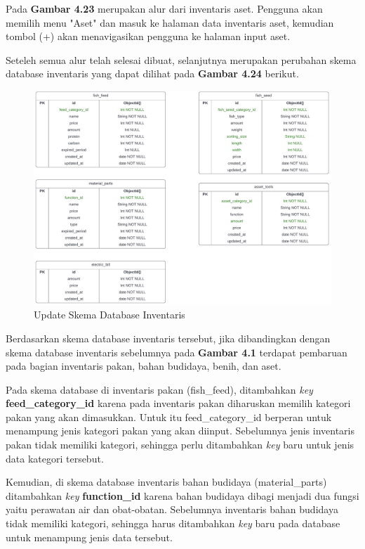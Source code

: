 \begin{spacing}{1.5}
	Pada \textbf{Gambar 4.23} merupakan alur dari inventaris aset. Pengguna akan memilih menu "Aset" dan masuk ke halaman data inventaris aset, kemudian tombol (+) akan menavigasikan pengguna ke halaman input aset.

	Seteleh semua alur telah selesai dibuat, selanjutnya merupakan perubahan skema database inventaris yang dapat dilihat pada \textbf{Gambar 4.24} berikut.

	\begin{figure}[H]
		\centering
		\includegraphics[width=1\textwidth]{gambar/sprint2/inventory_schema.jpeg}
		\caption{Update Skema Database Inventaris}
	\end{figure}

	Berdasarkan skema database inventaris tersebut, jika dibandingkan dengan skema database inventaris sebelumnya pada \textbf{Gambar 4.1} terdapat pembaruan pada bagian inventaris pakan, bahan budidaya, benih, dan aset.

	Pada skema database di inventaris pakan (fish\_feed), ditambahkan \textit{key} \textbf{feed\_category\_id} karena pada inventaris pakan diharuskan memilih kategori pakan yang akan dimasukkan. Untuk itu feed\_category\_id berperan untuk menampung jenis kategori pakan yang akan diinput. Sebelumnya jenis inventaris pakan tidak memiliki kategori, sehingga perlu ditambahkan \textit{key} baru untuk jenis data kategori tersebut.

	Kemudian, di skema database inventaris bahan budidaya (material\_parts) ditambahkan \textit{key} \textbf{function\_id} karena bahan budidaya dibagi menjadi dua fungsi yaitu perawatan air dan obat-obatan. Sebelumnya inventaris bahan budidaya tidak memiliki kategori, sehingga harus ditambahkan \textit{key} baru pada database untuk menampung jenis data tersebut.


\end{spacing}
